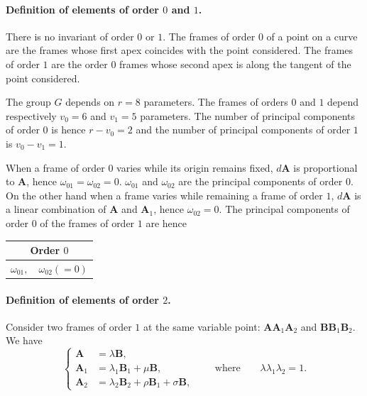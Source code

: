 \paragraph{Definition of elements of order $0$ and $1$.}
\label{sec:142}
There is no invariant of order $0$ or $1$. The frames of order $0$ of a point on a curve are the frames whose first apex coincides with the point considered. The frames of order $1$ are the order $0$ frames whose second apex is along the tangent of the point considered.

The group $G$ depends on $r=8$ parameters. The frames of orders $0$ and $1$ depend respectively $v_{0}=6$ and $v_{1}=5$ parameters. The number of principal components of order $0$ is hence $r-v_{0}=2$ and the number of principal components of order $1$ is $v_{0}-v_{1}=1$.

When a frame of order $0$ varies while its origin remains fixed, $d\mathbf{A}$ is proportional to $\mathbf{A}$, hence $\omega_{01}=\omega_{02}=0$. $\omega_{01}$ and $\omega_{02}$ are the principal components of order $0$. On the other hand when a frame varies while remaining a frame of order $1$, $d\mathbf{A}$ is a linear combination of $\mathbf{A}$ and $\mathbf{A}_{1}$, hence $\omega_{02}=0$. The principal components of order $0$ of the frames of order $1$ are hence
 \begin{center}  
\begin{tabular}{|c|}
  \hline
  Order $0$\\
  \hline
  $\omega_{01},\quad\omega_{02}(=0)$\\
  \hline
\end{tabular}
\end{center}


\paragraph{Definition of elements of order $2$.}
\label{sec:143}
Consider two frames of order $1$ at the same variable point: $\mathbf{AA}_{1}\mathbf{A}_{2}$ and $\mathbf{BB}_{1}\mathbf{B}_{2}$. We have
\begin{equation}
  \label{eq:10.3.4}
  \left\{
    \begin{aligned}
      \mathbf{A}_{\phantom{0}}&=\lambda\mathbf{B},\\
      \mathbf{A}_{{1}}&=\lambda_{1}\mathbf{B}_{1}+\mu\mathbf{B},\\
      \mathbf{A}_{{2}}&=\lambda_{2}\mathbf{B}_{2}+\rho\mathbf{B}_{1}+\sigma\mathbf{B},
    \end{aligned}
  \right.\qquad\text{where}\qquad\lambda\lambda_{1}\lambda_{2}=1.
\end{equation}

